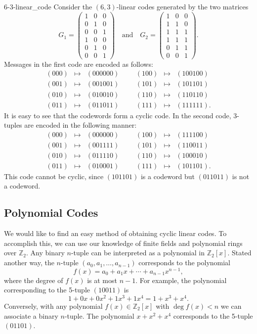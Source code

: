 \begin{example}{6-3-linear_code}
Consider the $(6,3)$-linear codes generated by the two matrices
\[
G_1 
= 
\begin{pmatrix}
1 & 0 & 0 \\
0 & 1 & 0 \\
0 & 0 & 1 \\
1 & 0 & 0 \\
0 & 1 & 0 \\
0 & 0 & 1 
\end{pmatrix}
\quad
\text{and}
\quad
G_2 = 
\begin{pmatrix}
1 & 0 & 0 \\
1 & 1 & 0 \\
1 & 1 & 1 \\
1 & 1 & 1 \\
0 & 1 & 1 \\
0 & 0 & 1
\end{pmatrix}.
\]
Messages in the first code are encoded as follows:
\[
\begin{array}{rclccrcl}
(000) & \mapsto & (000000) & & & (100) & \mapsto & (100100) \\
(001) & \mapsto & (001001) & & & (101) & \mapsto & (101101) \\
(010) & \mapsto & (010010) & & & (110) & \mapsto & (110110) \\
(011) & \mapsto & (011011) & & & (111) & \mapsto & (111111).
\end{array}
\]
It is easy to see that the codewords form a cyclic code.  In the second code, 3-tuples are encoded in the following manner:
\[
\begin{array}{rclccrcl}
(000) & \mapsto & (000000) & & & (100) & \mapsto & (111100) \\
(001) & \mapsto & (001111) & & & (101) & \mapsto & (110011) \\
(010) & \mapsto & (011110) & & & (110) & \mapsto & (100010) \\
(011) & \mapsto & (010001) & & & (111) & \mapsto & (101101).
\end{array}
\]
This code cannot be cyclic, since $(101101)$ is a codeword but $(011011)$ is not a codeword.
\end{example}


\subsection*{Polynomial Codes}

We would like to find an easy method of obtaining cyclic linear codes.  To accomplish this, we can use our knowledge of finite fields and  polynomial rings over ${\mathbb Z}_2$.  Any binary $n$-tuple can be
interpreted as a polynomial in ${\mathbb Z}_2[x]$.  Stated another way, the $n$-tuple $(a_0, a_1, \ldots, a_{n-1} )$ corresponds to the polynomial
\[
f(x) = a_0 +  a_1 x +  \cdots + a_{n-1} x^{n-1},
\]
where the degree of $f(x)$ is at most $n-1$.   For example, the polynomial corresponding to the 5-tuple $(10011)$ is  
\[
1 + 0 x + 0 x^2 + 1 x^3 + 1 x^4 = 1 + x^3 + x^4.
\]
Conversely, with any polynomial $f(x) \in {\mathbb Z}_2[x]$ with $\deg f(x) < n$ we can associate a binary $n$-tuple.  The polynomial $x + x^2 + x^4$ corresponds to the 5-tuple $(01101)$.


